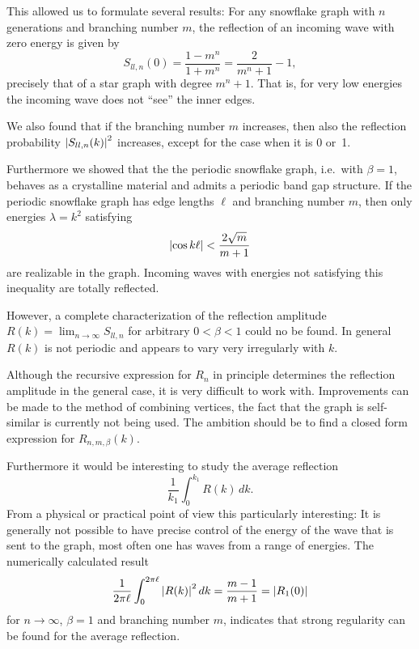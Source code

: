 This allowed us to formulate several results: For any snowflake graph with $n$ generations and branching number $m$, the reflection of an incoming wave with zero energy is given by
\[
  S_{ll,n}(0) = \frac{1-m^n}{1+m^n} = \frac{2}{m^n+1} - 1,
\]
precisely that of a star graph with degree $m^n+1$. That is, for very low energies the incoming wave does not ``see'' the inner edges.

We also found that if the branching number $m$ increases, then also the reflection probability $\left\lvert S_{ll,n}(k)\right\rvert^2$ increases, except for the case when it is 0 or~1.

Furthermore we showed that the the periodic snowflake graph, i.e.\ with $\beta=1$, behaves as a crystalline material and admits a periodic band gap structure. If the periodic snowflake graph has edge lengths $\ell$ and branching number $m$, then only energies $\lambda = k^2$ satisfying
\[
  \left\lvert\cos k\ell\right\rvert < \frac{2\sqrt{m}}{m+1}
\]
are realizable in the graph. Incoming waves with energies not satisfying this inequality are totally reflected.

However, a complete characterization of the reflection amplitude $R(k) = \lim_{n\to\infty} S_{ll,n}$ for arbitrary $0<\beta<1$ could no be found. In general $R(k)$ is not periodic and appears to vary very irregularly with $k$.

Although the recursive expression for $R_n$ in principle determines the reflection amplitude in the general case, it is very difficult to work with. Improvements can be made to the method of combining vertices, the fact that the graph is self-similar is currently not being used. The ambition should be to find a closed form expression for $R_{n,m,\beta}(k)$.

Furthermore it would be interesting to study the average reflection
\[
  \frac{1}{k_1} \int_{0}^{k_1} R(k) \, dk.
\]
From a physical or practical point of view this particularly interesting: It is generally not possible to have precise control of the energy of the wave that is sent to the graph, most often one has waves from a range of energies. The numerically calculated result
\[
  \frac{1}{2\pi\ell} \int_{0}^{2\pi\ell} \left\lvert R(k)\right\rvert^2 dk = \frac{m-1}{m+1} = \left\lvert R_1(0)\right\rvert
\]
for $n\to\infty$, $\beta=1$ and branching number $m$, indicates that strong regularity can be found for the average reflection.
